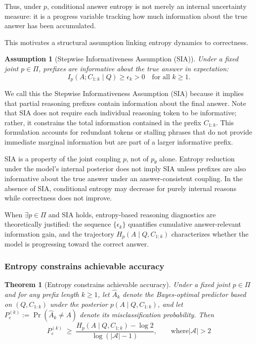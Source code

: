 \documentclass{article}
\newtheorem{assumption}{Assumption}
\newtheorem{theorem}{Theorem}
\begin{document}
Thus, under $p$, conditional answer entropy is not merely an internal uncertainty measure: it is a progress variable tracking how much information about the true answer has been accumulated.

This motivates a structural assumption linking entropy dynamics to correctness.

\begin{assumption}[Stepwise Informativeness Assumption (SIA)]
\label{ass:SIA}
Under a fixed joint $p\in\Pi$, prefixes are informative about the true answer in expectation:
\[
I_p(A;C_{1:k}\mid Q)
\ge \epsilon_k > 0
\quad
\text{for all } k\ge 1.
\] 
\end{assumption}

We call this the Stepwise Informativeness Assumption (SIA) because it implies that partial reasoning prefixes contain information about the final answer. Note that SIA does not require each individual reasoning token to be informative; rather, it constrains the total information contained in the prefix $C_{1:k}$. This formulation accounts for redundant tokens or stalling phrases that do not provide immediate marginal information but are part of a larger informative prefix.

SIA is a property of the joint coupling $p$, not of $p_\theta$ alone. Entropy reduction under the model’s internal posterior does not imply SIA unless prefixes are also informative about the true answer under an answer-consistent coupling. In the absence of SIA, conditional entropy may decrease for purely internal reasons while correctness does not improve.

When $\exists p \in \Pi$ and SIA holds, entropy-based reasoning diagnostics are theoretically justified: the sequence $\{\epsilon_k\}$ quantifies cumulative answer-relevant information gain, and the trajectory $H_p(A\mid Q,C_{1:k})$ characterizes whether the model is progressing toward the correct answer.


\subsubsection{Entropy constrains achievable accuracy}
\label{subsec:entropy_constrains}

\begin{theorem}[Entropy constrains achievable accuracy]
\label{th:entropy_accuracy}
Under a fixed joint $p\in \Pi$ and for any prefix length $k \ge 1$, let $\widehat A_k$ denote the Bayes-optimal predictor
based on $(Q, C_{1:k})$ under the posterior $p(A \mid Q, C_{1:k})$, and let $P_e^{(k)} := \Pr(\widehat A_k \neq A)$ denote its misclassification probability. Then
\[
P_e^{(k)}
\;\ge\;
\frac{H_p(A \mid Q, C_{1:k}) - \log 2}{\log(|\mathcal{A}| - 1)}, \qquad \text{where} |\mathcal{A}|>2
\]
\end{theorem}
\end{document}
